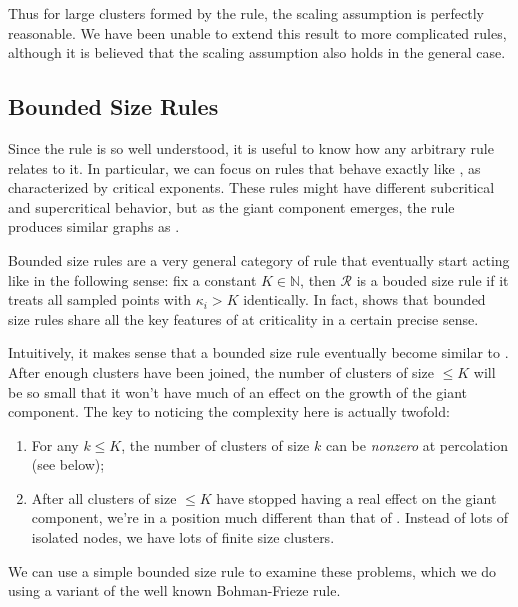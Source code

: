 \documentclass[twoside,10pt]{article}
\newcommand{\BF}{Bohman-Frieze\xspace}
\begin{document}
Thus for large clusters formed by the \ER rule, the scaling assumption is perfectly reasonable. We have been unable to extend this result to more complicated rules, although it is believed that the scaling assumption also holds in the general case.

\subsection{Bounded Size Rules}

Since the \ER rule is so well understood, it is useful to know how any arbitrary rule relates to it. In particular, we can focus on rules that behave exactly like \ER, as characterized by critical exponents. These rules might have different subcritical and supercritical behavior, but as the giant component emerges, the rule produces similar graphs as \ER.

Bounded size rules are a very general category of rule that eventually start acting like \ER in the following sense: fix a constant $K \in \mathbb{N}$, then $\mathcal{R}$ is a bouded size rule if it treats all sampled points with $\kappa_i > K$ identically. In fact, \cite{RW-bounded} shows that bounded size rules share all the key features of \ER at criticality in a certain precise sense.

Intuitively, it makes sense that a bounded size rule eventually become similar to \ER. After enough clusters have been joined, the number of clusters of size $\leq K$ will be so small that it won't have much of an effect on the growth of the giant component. The key to noticing the complexity here is actually twofold:

\begin{enumerate}
	\item For any $k \leq K$, the number of clusters of size $k$ can be \textit{nonzero} at percolation (see  below);
        \item After all clusters of size $\leq K$ have stopped having a real effect on the giant component, we're in a position much different than that of \ER. Instead of lots of isolated nodes, we have lots of finite size clusters.
\end{enumerate}

We can use a simple bounded size rule to examine these problems, which we do using a variant of the well known \BF rule.

\end{document}
